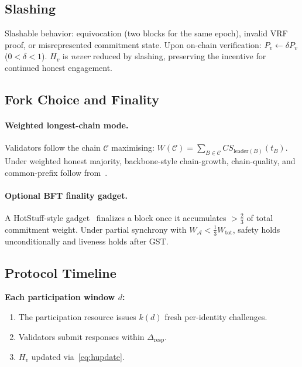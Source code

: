 \documentclass[10pt,journal,twoside]{IEEEtran}
\theoremstyle{remark}
\newcommand{\CS}{\mathit{CS}}
\begin{document}
	\subsection{Slashing}
	\label{ssec:slashing}
	
	Slashable behavior: equivocation (two blocks for the same
	epoch), invalid VRF proof, or misrepresented commitment state.
	Upon on-chain verification:
	$P_v \leftarrow \delta P_v$ ($0 < \delta < 1$).
	$H_v$ is \emph{never} reduced by slashing, preserving the
	incentive for continued honest engagement.
	
	\subsection{Fork Choice and Finality}
	\label{ssec:finality}
	
	\paragraph{Weighted longest-chain mode.}
	Validators follow the chain $\mathcal{C}$ maximising:
	$W(\mathcal{C}) = \sum_{B \in \mathcal{C}}
	\CS_{\mathrm{leader}(B)}(t_B)$.
	Under weighted honest majority, backbone-style chain-growth,
	chain-quality, and common-prefix follow
	from~\cite{garay2015bitcoin,pass2017hybrid}.
	
	\paragraph{Optional BFT finality gadget.}
	A HotStuff-style gadget~\cite{yin2019hotstuff,castro1999pbft}
	finalizes a block once it accumulates $>\tfrac{2}{3}$ of
	total commitment weight.
	Under partial synchrony with $W_{\mathcal{A}} <
	\tfrac{1}{3}W_{\mathrm{tot}}$, safety holds
	unconditionally and liveness holds after GST.
	
	\subsection{Protocol Timeline}
	\label{ssec:timeline}
	
	\noindent\textbf{Each participation window $d$:}
	\begin{enumerate}
		\item The participation resource issues $k(d)$ fresh
		per-identity challenges.
		\item Validators submit responses within
		$\Delta_{\mathrm{resp}}$.
		\item $H_v$ updated via~\eqref{eq:hupdate}.
	\end{enumerate}
	
\end{document}
